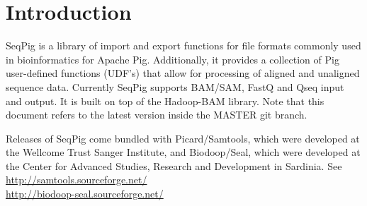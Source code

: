 \documentclass[a4paper,10pt,bibtotoc,abstracton,oneside,noindent,DIV15]{scrartcl}
\begin{document}
\tableofcontents

\section{Introduction}

SeqPig is a library of import and export functions for file formats
commonly used in bioinformatics for Apache Pig. Additionally, it provides a
collection of Pig user-defined functions (UDF's) that allow for processing
of aligned and unaligned sequence data. Currently SeqPig supports BAM/SAM,
FastQ and Qseq input and output. It is built on top of the Hadoop-BAM
library. Note that this document refers to the latest version inside the MASTER git branch.

\noindent Releases of SeqPig come bundled with Picard/Samtools, which were
developed at the Wellcome Trust Sanger Institute, and Biodoop/Seal, which
were developed
at the Center for Advanced Studies, Research and Development in Sardinia. See\\
\url{http://samtools.sourceforge.net/}\\
\url{http://biodoop-seal.sourceforge.net/}



\end{document}
